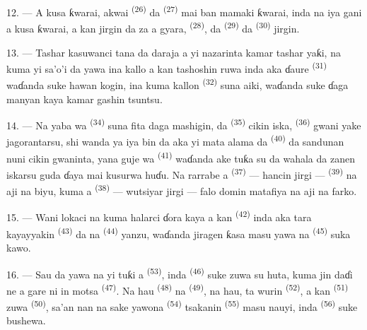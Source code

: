 12. --- A kusa ƙwarai, akwai 
\textsuperscript{(26)} da 
\textsuperscript{(27)} mai ban mamaki ƙwarai, inda na iya gani a kusa
ƙwarai, a kan jirgin da za a gyara, 
\textsuperscript{(28)}, da  \textsuperscript{(29)} da
 \textsuperscript{(30)} jirgin.

13. --- Tashar kasuwanci tana da daraja a yi nazarinta kamar tashar
yaƙi, na kuma yi sa’o’i da yawa ina kallo a kan tashoshin ruwa inda aka
ɗaure  \textsuperscript{(31)} waɗanda suke
hawan kogin, ina kuma kallon 
\textsuperscript{(32)} suna aiki, waɗanda suke ɗaga manyan kaya kamar
gashin tsuntsu.

\VUsaut{4.0mm}
\VUsaut{3.0mm}

14. --- Na yaba wa  \textsuperscript{(34)}
suna fita daga mashigin, da  \textsuperscript{(35)} cikin
iska,  \textsuperscript{(36)} gwani yake
jagorantarsu, shi wanda ya iya bin  da aka yi mata
alama da  \textsuperscript{(40)} da sandunan nuni cikin
gwaninta, yana guje wa 
\textsuperscript{(41)} waɗanda ake tuƙa su da wahala da zanen iskarsu
guda ɗaya mai kusurwa huɗu. Na rarrabe a 
\textsuperscript{(37)} — hancin jirgi — 
\textsuperscript{(39)} na aji na biyu, kuma a 
\textsuperscript{(38)} — wutsiyar jirgi — falo domin matafiya na aji na
farko.

15. --- Wani lokaci na kuma halarci ɗora kaya a kan  \textsuperscript{(42)} inda aka tara kayayyakin 
\textsuperscript{(43)} da na  \textsuperscript{(44)}
yanzu, waɗanda jiragen ƙasa masu yawa na 
\textsuperscript{(45)} suka kawo.

\VUsaut{3.0mm}
\VUsaut{3.0mm}

16. --- Sau da yawa na yi tuƙi a 
\textsuperscript{(53)}, inda 
\textsuperscript{(46)} suke zuwa su huta, kuma jin daɗi ne a gare ni in
motsa  \textsuperscript{(47)}. Na hau  \textsuperscript{(48)} na 
\textsuperscript{(49)}, na hau, ta wurin 
\textsuperscript{(52)}, a kan  \textsuperscript{(51)} zuwa
 \textsuperscript{(50)}, sa’an nan na sake yawona
 \textsuperscript{(54)} tsakanin  \textsuperscript{(55)} masu nauyi, inda 
\textsuperscript{(56)} suke bushewa.

